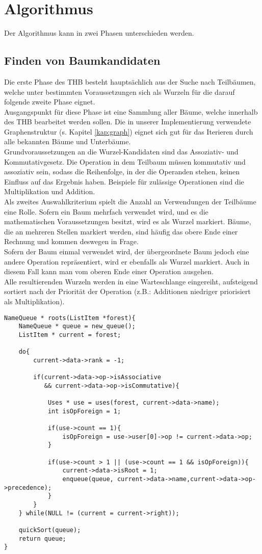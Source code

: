 \chapter{Algorithmus}
Der Algorithmus kann in zwei Phasen unterschieden werden.

\section{Finden von Baumkandidaten}
Die erste Phase des \ac{THB} besteht hauptsächlich aus der Suche nach Teilbäumen, welche unter bestimmten Voraussetzungen sich als Wurzeln für die darauf folgende zweite Phase eignet.\\
Ausgangspunkt für diese Phase ist eine Sammlung aller Bäume, welche innerhalb des THB bearbeitet werden sollen. Die in unserer Implementierung verwendete Graphenstruktur (s. Kapitel \ref{kap:graph}) eignet sich gut für das Iterieren durch alle bekannten Bäume und Unterbäume.\\
Grundvoraussetzungen an die Wurzel-Kandidaten sind das Assoziativ- und Kommutativgesetz. Die Operation in dem Teilbaum müssen kommutativ und assoziativ sein, sodass die Reihenfolge, in der die Operanden stehen, keinen Einfluss auf das Ergebnis haben. Beispiele für zulässige Operationen sind die Multiplikation und Addition.\\
Als zweites Auswahlkriterium spielt die Anzahl an Verwendungen der Teilbäume eine Rolle. Sofern ein Baum mehrfach verwendet wird, und es die mathematischen Voraussetzungen besitzt, wird es als Wurzel markiert. Bäume, die an mehreren Stellen markiert werden, sind häufig das obere Ende einer Rechnung und kommen deswegen in Frage.\\
Sofern der Baum einmal verwendet wird, der übergeordnete Baum jedoch eine andere Operation repräsentiert, wird er ebenfalls als Wurzel markiert. Auch in diesem Fall kann man vom oberen Ende einer Operation ausgehen.\\
Alle resultierenden Wurzeln werden in eine Warteschlange eingereiht, aufsteigend sortiert nach der Priorität der Operation (z.B.: Additionen niedriger priorisiert als Multiplikation).\\

\begin{lstlisting}[caption=Phase 1: Roots, label=list:roots]
NameQueue * roots(ListItem *forest){
	NameQueue * queue = new_queue();
	ListItem * current = forest;
	
	do{
		current->data->rank = -1;
		
		if(current->data->op->isAssociative 
		   && current->data->op->isCommutative){
			
			Uses * use = uses(forest, current->data->name);
			int isOpForeign = 1;          
			
			if(use->count == 1){
				isOpForeign = use->user[0]->op != current->data->op;
			}
			
			if(use->count > 1 || (use->count == 1 && isOpForeign)){               
				current->data->isRoot = 1;
				enqueue(queue, current->data->name,current->data->op->precedence);
			}
		}
	} while(NULL != (current = current->right));
	
	quickSort(queue);
	return queue;
}
\end{lstlisting}

